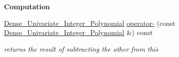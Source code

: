 \begin{Indent}\textbf{ Computation}\par
\begin{DoxyCompactItemize}
\item 
\mbox{\label{class_dense___univariate___integer___polynomial_acd4d8a0d3e9e6704a6ea91e9c29cfea0}} 
\hyperlink{class_dense___univariate___integer___polynomial}{Dense\+\_\+\+Univariate\+\_\+\+Integer\+\_\+\+Polynomial} \hyperlink{class_dense___univariate___integer___polynomial_acd4d8a0d3e9e6704a6ea91e9c29cfea0}{operator-\/} (const \hyperlink{class_dense___univariate___integer___polynomial}{Dense\+\_\+\+Univariate\+\_\+\+Integer\+\_\+\+Polynomial} \&) const
\begin{DoxyCompactList}\small\item\em returns the result of subtracting the other from {\ttfamily this} \end{DoxyCompactList}\end{DoxyCompactItemize}
\end{Indent}
